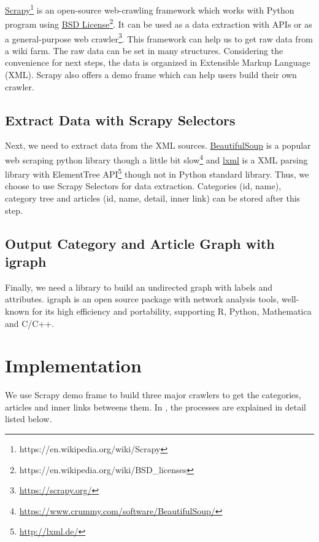 \href{https://scrapy.org/}{Scrapy}\footnote{https://en.wikipedia.org/wiki/Scrapy} is an open-source web-crawling framework which works with Python program using \href{http://www.linfo.org/bsdlicense.html}{BSD License}\footnote{https://en.wikipedia.org/wiki/BSD\_licenses}. It can be used as a data extraction with APIs or as a general-purpose web crawler\footnote{\href{https://scrapy.org/}{https://scrapy.org/}}. This framework can help us to get raw data from a wiki farm. The raw data can be set in many structures. Considering the convenience for next steps, the data is organized in Extensible Markup Language (XML). Scrapy also offers a demo frame which can help users build their own crawler.\\

\subsection{Extract Data with Scrapy Selectors}
Next, we need to extract data from the XML sources. \href{https://www.crummy.com/software/BeautifulSoup/}{BeautifulSoup} is a popular web scraping python library though a little bit slow\footnote{\href{https://www.crummy.com/software/BeautifulSoup/}{https://www.crummy.com/software/BeautifulSoup/}} and \href{http://lxml.de/}{lxml} is a XML parsing library with ElementTree API\footnote{\href{http://lxml.de/}{http://lxml.de/}} though not in Python standard library. Thus, we choose to use Scrapy Selectors for data extraction. Categories (id, name), category tree and articles (id, name, detail, inner link) can be stored after this step.

\subsection{Output Category and Article Graph with igraph}
Finally, we need a library to build an undirected graph with labels and attributes. igraph is an open source package with network analysis tools, well-known for its high efficiency and portability, supporting R, Python, Mathematica and C/C++.

\section{Implementation}
We use Scrapy demo frame to build three major crawlers to get the categories, articles and inner links betweens them. In , the processes are explained in detail listed below.


